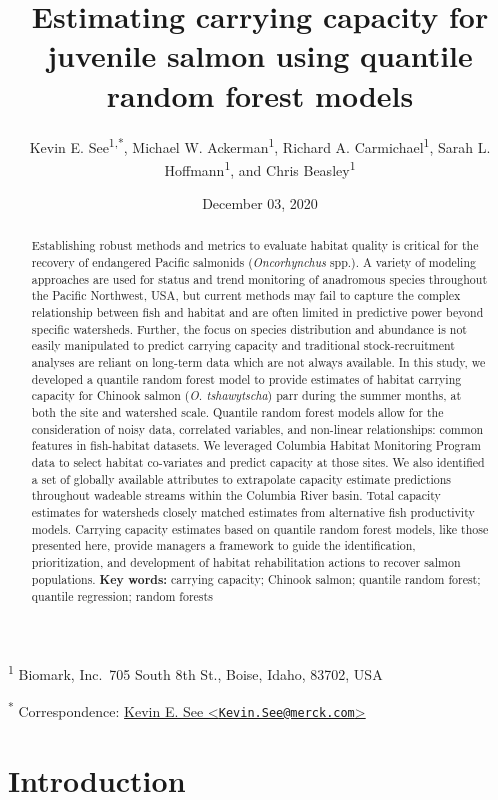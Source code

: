 \documentclass[
  12pt,
]{article}
\title{Estimating carrying capacity for juvenile salmon using quantile random forest models}
\author{Kevin E. See\textsuperscript{1,*}, Michael W. Ackerman\textsuperscript{1}, Richard A. Carmichael\textsuperscript{1}, Sarah L. Hoffmann\textsuperscript{1}, and Chris Beasley\textsuperscript{1}}
\date{December 03, 2020}
\begin{document}
\maketitle
\begin{abstract}
Establishing robust methods and metrics to evaluate habitat quality is critical for the recovery of endangered Pacific salmonids (\emph{Oncorhynchus} spp.). A variety of modeling approaches are used for status and trend monitoring of anadromous species throughout the Pacific Northwest, USA, but current methods may fail to capture the complex relationship between fish and habitat and are often limited in predictive power beyond specific watersheds. Further, the focus on species distribution and abundance is not easily manipulated to predict carrying capacity and traditional stock-recruitment analyses are reliant on long-term data which are not always available. In this study, we developed a quantile random forest model to provide estimates of habitat carrying capacity for Chinook salmon (\emph{O. tshawytscha}) parr during the summer months, at both the site and watershed scale. Quantile random forest models allow for the consideration of noisy data, correlated variables, and non-linear relationships: common features in fish-habitat datasets. We leveraged Columbia Habitat Monitoring Program data to select habitat co-variates and predict capacity at those sites. We also identified a set of globally available attributes to extrapolate capacity estimate predictions throughout wadeable streams within the Columbia River basin. Total capacity estimates for watersheds closely matched estimates from alternative fish productivity models. Carrying capacity estimates based on quantile random forest models, like those presented here, provide managers a framework to guide the identification, prioritization, and development of habitat rehabilitation actions to recover salmon populations.
\textbf{Key words:} carrying capacity; Chinook salmon; quantile random forest; quantile regression; random forests
\end{abstract}

\textsuperscript{1} Biomark, Inc.~705 South 8th St., Boise, Idaho, 83702, USA

\textsuperscript{*} Correspondence: \href{mailto:Kevin.See@merck.com}{Kevin E. See \textless{}\href{mailto:Kevin.See@merck.com}{\nolinkurl{Kevin.See@merck.com}}\textgreater{}}

\hypertarget{introduction}{%
\section{Introduction}\label{introduction}}
\end{document}
